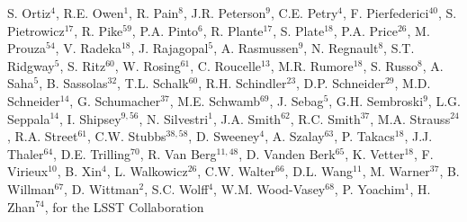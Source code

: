 {S. Ortiz$^4$,
R.E. Owen$^1$,
R. Pain$^{8}$,
J.R. Peterson$^{9}$,
C.E. Petry$^{4}$,
F. Pierfederici$^{40}$,
S. Pietrowicz$^{17}$,
R. Pike$^{59}$,
P.A. Pinto$^{6}$,
R. Plante$^{17}$,
S. Plate$^{18}$,
P.A. Price$^{26}$,
M. Prouza$^{54}$,
V. Radeka$^{18}$,
J. Rajagopal$^5$,
A. Rasmussen$^9$,
N. Regnault$^8$,
S.T. Ridgway$^5$,
S. Ritz$^{60}$,
W. Rosing$^{61}$,
C. Roucelle$^{13}$,
M.R. Rumore$^{18}$,
S. Russo$^8$,
A. Saha$^{5}$,
B. Sassolas$^{32}$,
T.L. Schalk$^{60}$,
R.H. Schindler$^{23}$,
D.P. Schneider$^{29}$,
M.D. Schneider$^{14}$,
G. Schumacher$^{37}$,
M.E. Schwamb$^{69}$,
J. Sebag$^5$,
G.H. Sembroski$^9$,
L.G. Seppala$^{14}$,
I. Shipsey$^{9,56}$,
N. Silvestri$^1$,
J.A. Smith$^{62}$,
R.C. Smith$^{37}$,
M.A. Strauss$^{24}$,
R.A. Street$^{61}$,
C.W. Stubbs$^{38,58}$,
D. Sweeney$^4$,
A. Szalay$^{63}$,
P. Takacs$^{18}$,
J.J. Thaler$^{64}$,
D.E. Trilling$^{70}$,
R. Van Berg$^{11,48}$,
D. Vanden Berk$^{65}$,
K. Vetter$^{18}$,
F. Virieux$^{10}$,
B. Xin$^4$,
L. Walkowicz$^{26}$,
C.W. Walter$^{66}$,
D.L. Wang$^{11}$,
M. Warner$^{37}$,
B. Willman$^{67}$,
D. Wittman$^2$,
S.C. Wolff$^4$,
W.M. Wood-Vasey$^{68}$,
P. Yoachim$^1$,
H. Zhan$^{74}$,
for the LSST Collaboration
}
\affil{}

